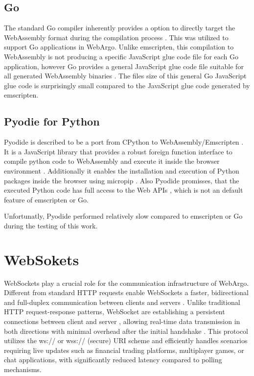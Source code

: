 \subsection{Go}
\label{subsec:methodology:wasm:go}
The standard Go compiler inherently provides a option to directly target the WebAssembly format during the compilation process \cite{methodology:go}. This was utilized to support Go applications in WebArgo. Unlike emscripten, this compilation to WebAssembly is not producing a specific JavaScript glue code file for each Go application, however Go provides a general JavaScript glue code file suitable for all generated WebAssembly binaries \cite{methodology:go}. The files size of this general Go JavaScript glue code is surprisingly small compared to the JavaScript glue code generated by emscripten.

\subsection{Pyodie for Python}
\label{subsec:methodology:wasm:python}
Pyodide is described to be a port from CPython to WebAssembly/Emscripten \cite{methodology:pyodie}. It is a JavaScript library that provides a robust foreign function interface to compile python code to WebAssembly and execute it inside the browser environment \cite{methodology:pyodie}. Additionally it enables the installation and execution of Python packages inside the browser using micropip \cite{methodology:pyodie}. Also Pyodide promisses, that the executed Python code has full access to the Web \ac{API}s \cite{methodology:pyodie}, which is not an default feature of emscripten or Go.

Unfortunatly, Pyodide performed relatively slow compared to emscripten or Go during the testing of this work.

\section{WebSokets}
\label{sec:methodology:websokets}
WebSockets play a crucial role for the communication infrastructure of WebArgo. Different from standard \ac{HTTP} requests enable WebSockets a faster, bidirectional and full-duplex communication between clients and servers \cite{methodology:websockets1, methodology:websockets3, methodology:websockets2}. Unlike traditional \ac{HTTP} request-response patterns, WebSocket are establishing a persistent connections between client and server \cite{methodology:websockets3}, allowing real-time data transmission in both directions with minimal overhead after the initial handshake \cite{methodology:websockets3}. This protocol utilizes the ws:// or wss:// (secure) URI scheme and efficiently handles scenarios requiring live updates such as financial trading platforms, multiplayer games, or chat applications, with significantly reduced latency compared to polling mechanisms.

